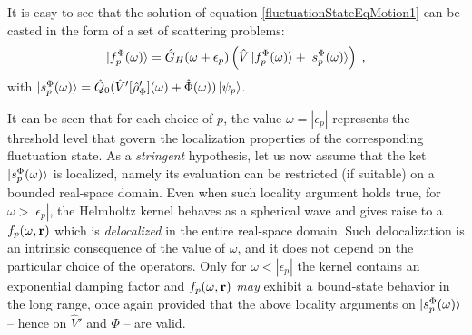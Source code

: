 \documentclass[reprint,aps,prb]{revtex4-1}
\renewcommand{\r}{{\bf r}}
\newcommand{\eps}{\epsilon}
\newcommand{\be}{\begin{equation}}
\newcommand{\ee}{\end{equation}}
\newcommand{\lb}{\label}
\newcommand{\op}[1]{\hat {#1}}
\newcommand{\dm}{\op{\rho}}
\begin{document}
It is easy to see that the solution of equation \eqref{fluctuationStateEqMotion1} can be casted in the form of
a set of scattering problems:
\be\lb{rhoPrimeFluctuationStateDef2}
\ket{f_p^\Phi(\omega)} = \op G_H(\omega+\epsilon_p)\left(\op V\ket{f_p^\Phi(\omega)} + \ket{s_p^\Phi(\omega)} \right)\;,
\ee
with%
$%
\ket{s_p^\Phi(\omega)} = \op Q_0(\op V'[\dm'_\Phi](\omega) + \op \Phi(\omega))\ket{\psi_p}
$. %

It can be seen that for each choice of $p$, the value $\omega = |\eps_p|$ represents the threshold level 
that govern the localization properties of the corresponding 
fluctuation state.
As a \emph{stringent} hypothesis, 
let us now assume that the ket $\ket{s_p^\Phi(\omega)}$ is localized, namely its evaluation can be
restricted (if suitable) on a bounded real-space domain.
Even when such locality argument holds true, for $\omega > |\eps_p|$, 
the Helmholtz kernel behaves as a spherical wave and  gives raise to a $f_p(\omega,\r)$ which is \emph{delocalized} in the entire real-space domain.
Such delocalization is an intrinsic consequence of the value of $\omega$, and it does not depend on the particular
choice of the operators.
Only for $\omega < |\eps_p|$ the kernel contains an exponential damping factor and $f_p(\omega,\r)$ \emph{may} 
exhibit a bound-state behavior in the long range, once again provided that the above locality arguments on $\ket{s_p^\Phi(\omega)}$ 
-- hence on $\op V'$ and $\Phi$ -- are valid.
\end{document}
